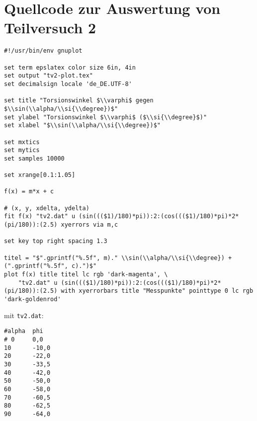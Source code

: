 \section{\gnuplot{} Quellcode zur Auswertung von Teilversuch 2}
    \label{appdx:gnuplottv2}
    {  
        \renewcommand{\fcolorbox}[4][]{#4}
        \begin{verbatim}
#!/usr/bin/env gnuplot

set term epslatex color size 6in, 4in
set output "tv2-plot.tex"
set decimalsign locale 'de_DE.UTF-8'

set title "Torsionswinkel $\\varphi$ gegen $\\sin(\\alpha/\\si{\\degree})$"
set ylabel "Torsionswinkel $\\varphi$ ($\\si{\\degree}$)"
set xlabel "$\\sin(\\alpha/\\si{\\degree})$"

set mxtics
set mytics
set samples 10000

set xrange[0.1:1.05]

f(x) = m*x + c

# (x, y, xdelta, ydelta)
fit f(x) "tv2.dat" u (sin((($1)/180)*pi)):2:(cos((($1)/180)*pi)*2*(pi/180)):(2.5) xyerrors via m,c

set key top right spacing 1.3

titel = "$".gprintf("%.5f", m)." \\sin(\\alpha/\\si{\\degree}) + (".gprintf("%.5f", c).")$"
plot f(x) title titel lc rgb 'dark-magenta', \
    "tv2.dat" u (sin((($1)/180)*pi)):2:(cos((($1)/180)*pi)*2*(pi/180)):(2.5) with xyerrorbars title "Messpunkte" pointtype 0 lc rgb 'dark-goldenrod'
        \end{verbatim}
    }
    mit \texttt{tv2.dat}:
    \begin{multicols}{2}
        \begin{verbatim}
#alpha  phi
# 0     0,0
10      -10,0
20      -22,0
30      -33,5
40      -42,0
50      -50,0
60      -58,0
70      -60,5
80      -62,5
90      -64,0
        \end{verbatim}
    \end{multicols}
